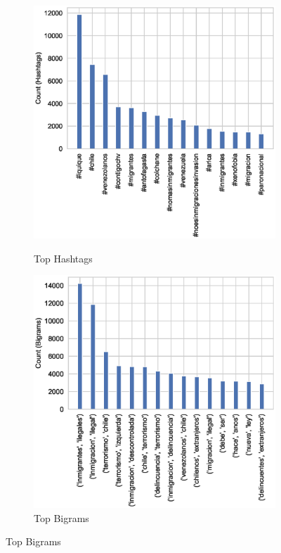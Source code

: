        \begin{figure}[H]
            \caption{Top 15 Hashtags and Bigrams, Total Corpus}
            \label{fig_hash_bi_tot}
            
            \centering
                \begin{subfigure}{0.49\textwidth}
                    \caption{Top Hashtags}
                    \centering        
                    \includegraphics[width=.99\linewidth]{figs/Common_Hashtags_1.eps}
                    \label{fig_hash_tot}
                \end{subfigure} %
                \begin{subfigure}{0.49\textwidth}
                    \caption{Top Bigrams}
                    \centering
                    \includegraphics[width=.99\linewidth]{figs/Common_Bigrams_1.eps}

\end{subfigure}
\end{figure}
